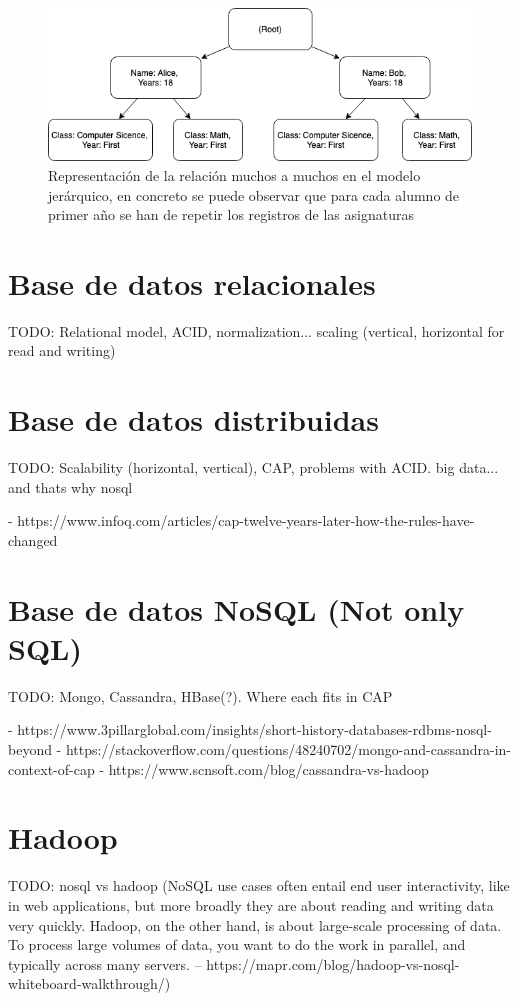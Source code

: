 \documentclass[12pt]{article}
\begin{document}
    \begin{figure}[h]
      \includegraphics[width=\textwidth]{HierarchicalModelManyToMany.png}
      \centering
      \caption[Representación de una relación muchos a muchos en el modelo jerárquico]{Representación de la relación muchos a muchos en el modelo jerárquico, en concreto se puede observar que para cada alumno de primer año se han de repetir los registros de las asignaturas}
      \label{fig:HierarchicalModelManyToMany}
    \end{figure}

  \section{Base de datos relacionales}
    TODO:
    Relational model, ACID, normalization... scaling (vertical, horizontal for read and writing)
  
  \section{Base de datos distribuidas}
    TODO:
    Scalability (horizontal, vertical), CAP, problems with ACID. big data... and thats why nosql

    - https://www.infoq.com/articles/cap-twelve-years-later-how-the-rules-have-changed

  \section{Base de datos NoSQL (Not only SQL)}
    TODO:
    Mongo, Cassandra, HBase(?). Where each fits in CAP

    - https://www.3pillarglobal.com/insights/short-history-databases-rdbms-nosql-beyond
    - https://stackoverflow.com/questions/48240702/mongo-and-cassandra-in-context-of-cap
    - https://www.scnsoft.com/blog/cassandra-vs-hadoop

  \section{Hadoop}
    TODO:
    nosql vs hadoop (NoSQL use cases often entail end user interactivity, like in web applications, but more broadly they are about reading and writing data very quickly. Hadoop, on the other hand, is about large-scale processing of data. To process large volumes of data, you want to do the work in parallel, and typically across many servers. -- https://mapr.com/blog/hadoop-vs-nosql-whiteboard-walkthrough/)
\end{document}
